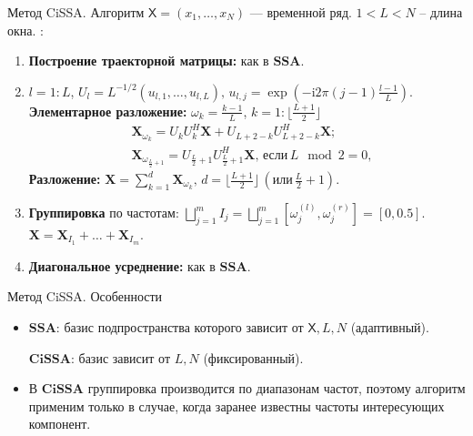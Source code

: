 \documentclass[notheorems, handout]{beamer}
\newcommand{\SSA}{\textbf{SSA}}
\newcommand{\CISSA}{\textbf{CiSSA}}
\newcommand{\TS}{\mathsf{X}}
\begin{document}
	\begin{frame}{Метод CiSSA. Алгоритм}
		\( \TS = (x_1, \ldots, x_N) \) — временной ряд.  \( 1 < L < N \) --  длина окна.
		\textbf{\structure{Алгоритм $\CISSA$}}:
		\begin{enumerate}
			\item \textbf{Построение траекторной матрицы:} как в $\SSA$.
			
			\item $l = 1:L$, ${U}_{l}=L^{-1/2}(u_{l,1},\dots,u_{l,L}), \, u_{l,j}=\exp\left(-\mathrm{i}2\pi(j-1)\frac{l-1}{L}\right).$
			\textbf{Элементарное разложение:} $\omega_k = \frac{k-1}{L}$, $k = 1:\lfloor \frac{L+1}{2} \rfloor$
			\begin{align*}
				&\mathbf X_{\omega_k}  = U_k U_k^H \mathbf X + U_{L+2-k} U_{L+2-k}^H \mathbf X;\\
				&\mathbf X_{\omega_{\frac{L}{2} + 1}}  = 
				U_{\frac{L}{2} + 1} U_{\frac{L}{2} + 1}^H \mathbf X, \, \text{если} \, L \mod 2 = 0,
			\end{align*}
			\textbf{Разложение:}
			$
			\mathbf{X} = \sum\limits_{k=1}^d \mathbf{X}_{\omega_k}, \, d = \lfloor \frac{L+1}{2} \rfloor \, (\text{или} \, \frac{L}{2} + 1).
			$

			\item \textbf{Группировка} по частотам:
			$\bigsqcup \limits_{j=1}^m I_j = 
			\bigsqcup \limits_{j=1}^m 
			\left[ \omega_j^{(l)}, \omega_j^{(r)} \right] =
			[0, 0.5]$. $\mathbf X = \mathbf X_{I_1} + \dots + \mathbf X_{I_m}$.

			\item \textbf{Диагональное усреднение:} как в $\SSA$.
		\end{enumerate}

	\end{frame}

	\begin{frame}{Метод CiSSA. Особенности}
		\bigskip
		\begin{itemize}
			\item $\SSA$: базис подпространства которого зависит от $\TS, L, N$ (адаптивный).
			
			$\CISSA$: базис зависит от $L, N$ (фиксированный).
			\bigskip
			\item В $\CISSA$ группировка производится по диапазонам частот, поэтому алгоритм применим только в случае, когда заранее известны частоты интересующих компонент.
		\end{itemize}
	\end{frame}
	
\end{document}
